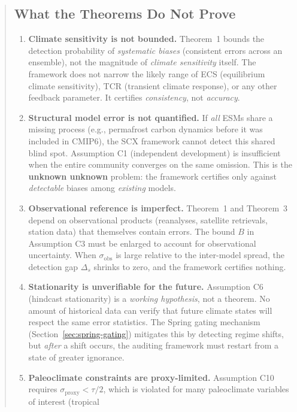 \documentclass[11pt,a4paper]{article}
\theoremstyle{plain}
\theoremstyle{definition}
\theoremstyle{remark}
\begin{document}
\begin{abstract}
\subsection{What the Theorems Do Not Prove}
\begin{enumerate}[label=\textbf{L\arabic*}, leftmargin=*]
  \item \textbf{Climate sensitivity is not bounded.}
    Theorem~1 bounds the detection probability of \emph{systematic biases}
    (consistent errors across an ensemble), not the magnitude of \emph{climate
    sensitivity} itself. The framework does not narrow the likely range of ECS
    (equilibrium climate sensitivity), TCR (transient climate response), or any
    other feedback parameter. It certifies \emph{consistency}, not
    \emph{accuracy}.
  \item \textbf{Structural model error is not quantified.}
    If \emph{all} ESMs share a missing process (e.g., permafrost carbon
    dynamics before it was included in CMIP6), the SCX framework cannot detect
    this shared blind spot. Assumption C1 (independent development) is
    insufficient when the entire community converges on the same omission.
    This is the \textbf{unknown unknown} problem: the framework certifies only
    against \emph{detectable} biases among \emph{existing} models.
  \item \textbf{Observational reference is imperfect.}
    Theorem~1 and Theorem~3 depend on observational products (reanalyses,
    satellite retrievals, station data) that themselves contain errors. The
    bound $B$ in Assumption C3 must be enlarged to account for observational
    uncertainty. When $\sigma_{\mathrm{obs}}$ is large relative to the
    inter-model spread, the detection gap $\Delta_s$ shrinks to zero, and the
    framework certifies nothing.
  \item \textbf{Stationarity is unverifiable for the future.}
    Assumption C6 (hindcast stationarity) is a \emph{working hypothesis}, not a
    theorem. No amount of historical data can verify that future climate states
    will respect the same error statistics. The Spring gating mechanism
    (Section~\ref{sec:spring-gating}) mitigates this by detecting regime shifts,
    but \emph{after} a shift occurs, the auditing framework must restart from a
    state of greater ignorance.
  \item \textbf{Paleoclimate constraints are proxy-limited.}
    Assumption C10 requires $\sigma_{\mathrm{proxy}} < \tau/2$, which is
    violated for many paleoclimate variables of interest (tropical

\end{enumerate}
\end{abstract}
\end{document}
